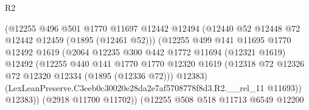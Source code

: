 \begin{lexlean}{R2}
\begin{coremodule}
                                        (@12255
                                          @496
                                          @501
                                          @1770
                                          @11697
                                          @12442
                                          @12494
                                          (@12440 @52 @12448 @72 @12442 @12459 (@1895 (@12461 @52)))
                                          (@12255
                                            @499
                                            @141
                                            @11695
                                            @1770
                                            @12492
                                            @1619
                                            (@2064
                                              @12235
                                              @300
                                              @442
                                              @1772
                                              @11694
                                              (@12321 @1619)
                                              @12492
                                              (@12255
                                                @440
                                                @141
                                                @1770
                                                @1770
                                                @12320
                                                @1619
                                                (@12318
                                                  @72
                                                  @12326
                                                  @72
                                                  @12320
                                                  @12334
                                                  (@1895 (@12336 @72)))
                                                @12383)
                                              (LexLeanPreserve.C3eeb0c30020e28da2e7af5708778f8d3.R2.__rel_11
                                                @11693))
                                            @12383))
                                        (@2918 @11700 @11702))
                                      (@12255
                                        @508
                                        @518
                                        @11713
                                        @6549
                                        @12200

\end{coremodule}
\end{lexlean}
